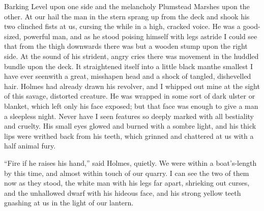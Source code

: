 \documentclass[12pt,english,oneside]{book}
\begin{document}
Barking Level upon one side and the melancholy Plumstead Marshes upon
the other. At our hail the man in the stern sprang up from the deck
and shook his two clinched fists at us, cursing the while in a high,
cracked voice. He was a good-sized, powerful man, and as he stood
poising himself with legs astride I could see that from the thigh
downwards there was but a wooden stump upon the right side. At the
sound of his strident, angry cries there was movement in the huddled
bundle upon the deck. It straightened itself into a little black man\mdsh{---}the
smallest I have ever seen\mdsh{---}with a great, misshapen head and
a shock of tangled, dishevelled hair. Holmes had already drawn his
revolver, and I whipped out mine at the sight of this savage, distorted
creature. He was wrapped in some sort of dark ulster or blanket, which
left only his face exposed; but that face was enough to give a man
a sleepless night. Never have I seen features so deeply marked with
all bestiality and cruelty. His small eyes glowed and burned with
a sombre light, and his thick lips were writhed back from his teeth,
which grinned and chattered at us with a half animal fury.

{}``Fire if he raises his hand,'' said Holmes, quietly. We were
within a boat's-length by this time, and almost within touch of our
quarry. I can see the two of them now as they stood, the white man
with his legs far apart, shrieking out curses, and the unhallowed
dwarf with his hideous face, and his strong yellow teeth gnashing
at us in the light of our lantern.
\end{document}
